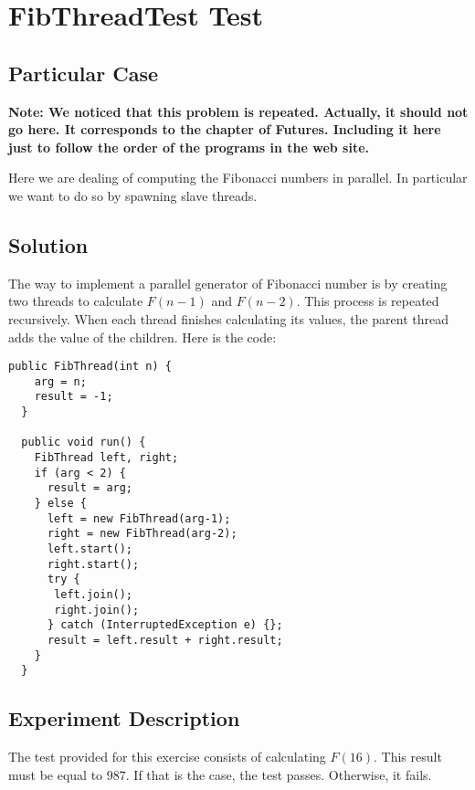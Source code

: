 \section{\textbf{FibThreadTest Test}}
\subsection{Particular Case}
\par
\textbf{Note: We noticed that this problem is repeated. Actually, it should not
go here. It corresponds to the chapter of Futures. Including it here just to
follow the order of the programs in the web site.}
\par
Here we are dealing of computing the Fibonacci numbers in parallel. In
particular we want to do so by spawning slave threads.
\par
\subsection{Solution}
\par
The way to implement a parallel generator of Fibonacci number is by creating two
threads to calculate $F(n-1)$ and $F(n-2)$. This process is repeated
recursively. When each thread finishes calculating its values, the parent thread
adds the value of the children. Here is the code:
\par
\hfill
\begin{lstlisting}[style=numbers]
  public FibThread(int n) {
    arg = n;
    result = -1;
  }

  public void run() {
    FibThread left, right;
    if (arg < 2) {
      result = arg;
    } else {
      left = new FibThread(arg-1);
      right = new FibThread(arg-2);
      left.start();
      right.start();
      try {
       left.join();
       right.join();
      } catch (InterruptedException e) {};
      result = left.result + right.result;
    }
  }
\end{lstlisting}
\hfill
\par
\subsection{Experiment Description}
\par
The test provided for this exercise consists of calculating $F(16)$. This result
must be equal to $987$. If that is the case, the test passes. Otherwise, it
fails.
\par
